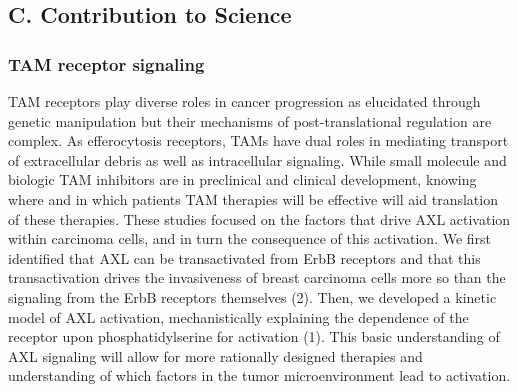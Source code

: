 \documentclass[11pt]{article}
\begin{document}
\subsection{C. Contribution to Science}




\subsubsection{TAM receptor signaling}

TAM receptors play diverse roles in cancer progression as elucidated through genetic manipulation but their mechanisms of post-translational regulation are complex. As efferocytosis receptors, TAMs have dual roles in mediating transport of extracellular debris as well as intracellular signaling. While small molecule and biologic TAM inhibitors are in preclinical and clinical development, knowing where and in which patients TAM therapies will be effective will aid translation of these therapies. These studies focused on the factors that drive AXL activation within carcinoma cells, and in turn the consequence of this activation. We first identified that AXL can be transactivated from ErbB receptors and that this transactivation drives the invasiveness of breast carcinoma cells more so than the signaling from the ErbB receptors themselves (2). Then, we developed a kinetic model of AXL activation, mechanistically explaining the dependence of the receptor upon phosphatidylserine for activation (1). This basic understanding of AXL signaling will allow for more rationally designed therapies and understanding of which factors in the tumor microenvironment lead to activation.
\end{document}
